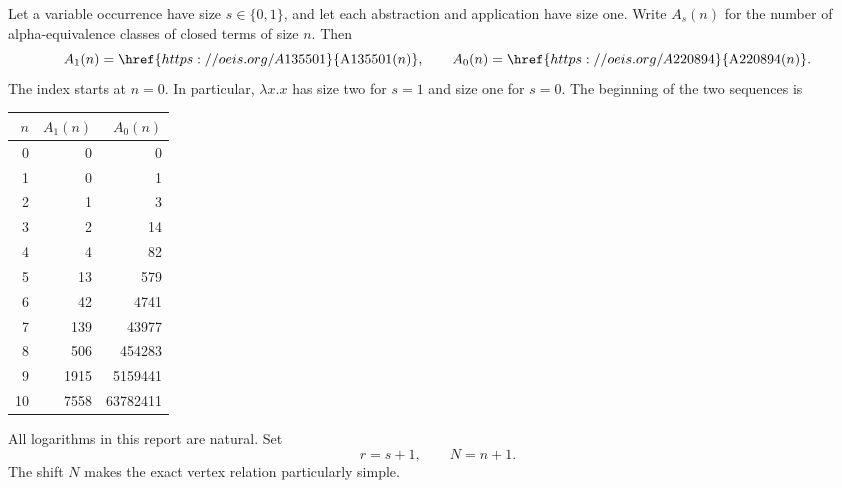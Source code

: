\documentclass[11pt,a4paper]{article}
\numberwithin{equation}{section}
\theoremstyle{remark}
\begin{document}
Let a variable occurrence have size $s\in\{0,1\}$, and let each abstraction and application have size one. Write $A_s(n)$ for the number of alpha-equivalence classes of closed terms of size $n$. Then
\[
 A_1(n)=\href{https://oeis.org/A135501}{\mathrm{A135501}(n)},
 \qquad A_0(n)=\href{https://oeis.org/A220894}{\mathrm{A220894}(n)}.
\]
The index starts at $n=0$. In particular, $\lambda x.x$ has size two for $s=1$ and size one for $s=0$. The beginning of the two sequences is
\begin{center}
\begin{tabular}{r rr}
\toprule
$n$ & $A_1(n)$ & $A_0(n)$\\
\midrule
0&0&0\\
1&0&1\\
2&1&3\\
3&2&14\\
4&4&82\\
5&13&579\\
6&42&4741\\
7&139&43977\\
8&506&454283\\
9&1915&5159441\\
10&7558&63782411\\
\bottomrule
\end{tabular}
\end{center}
All logarithms in this report are natural. Set
\begin{equation}\label{lam:bg:eq:parameters}
 r=s+1,\qquad N=n+1.
\end{equation}
The shift $N$ makes the exact vertex relation particularly simple.
\end{document}
